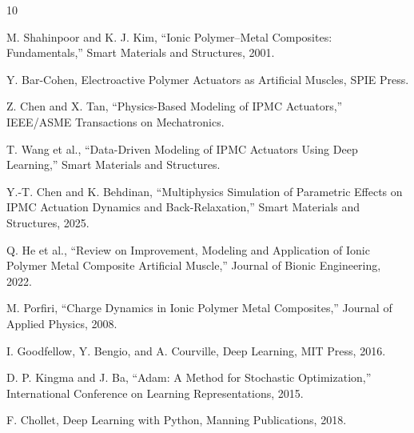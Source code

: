 \documentclass[11pt,a4paper]{article}
\begin{document}
\begin{thebibliography}{10}


M. Shahinpoor and K. J. Kim,
``Ionic Polymer--Metal Composites: Fundamentals,''
Smart Materials and Structures,
2001.

Y. Bar-Cohen,
Electroactive Polymer Actuators as Artificial Muscles,
SPIE Press.

Z. Chen and X. Tan,
``Physics-Based Modeling of IPMC Actuators,''
IEEE/ASME Transactions on Mechatronics.

T. Wang et al.,
``Data-Driven Modeling of IPMC Actuators Using Deep Learning,''
Smart Materials and Structures.

Y.-T. Chen and K. Behdinan,
``Multiphysics Simulation of Parametric Effects on IPMC Actuation Dynamics and Back-Relaxation,''
Smart Materials and Structures,
2025.

Q. He et al.,
``Review on Improvement, Modeling and Application of Ionic Polymer Metal Composite Artificial Muscle,''
Journal of Bionic Engineering,
2022.

M. Porfiri,
``Charge Dynamics in Ionic Polymer Metal Composites,''
Journal of Applied Physics,
2008.

I. Goodfellow, Y. Bengio, and A. Courville,
Deep Learning,
MIT Press,
2016.

D. P. Kingma and J. Ba,
``Adam: A Method for Stochastic Optimization,''
International Conference on Learning Representations,
2015.

F. Chollet,
Deep Learning with Python,
Manning Publications,
2018.

\end{thebibliography}
\end{document}
